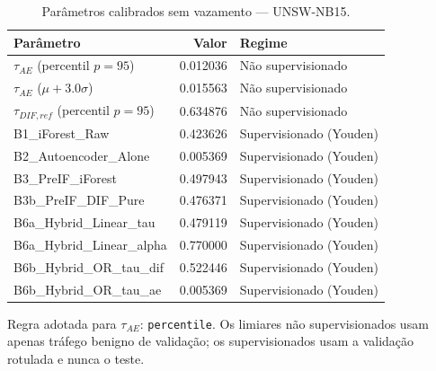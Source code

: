 \begin{table}[htbp]
\centering
\caption{Parâmetros calibrados sem vazamento — UNSW-NB15.}
\label{tab:calibracao-unsw-nb15}
\small
\begin{tabular}{lrl}
\hline
Parâmetro & Valor & Regime \\
\hline
$\tau_{AE}$ (percentil $p=95$) & 0.012036 & Não supervisionado \\
$\tau_{AE}$ ($\mu + 3.0\sigma$) & 0.015563 & Não supervisionado \\
$\tau_{DIF,ref}$ (percentil $p=95$) & 0.634876 & Não supervisionado \\
B1\_iForest\_Raw & 0.423626 & Supervisionado (Youden) \\
B2\_Autoencoder\_Alone & 0.005369 & Supervisionado (Youden) \\
B3\_PreIF\_iForest & 0.497943 & Supervisionado (Youden) \\
B3b\_PreIF\_DIF\_Pure & 0.476371 & Supervisionado (Youden) \\
B6a\_Hybrid\_Linear\_tau & 0.479119 & Supervisionado (Youden) \\
B6a\_Hybrid\_Linear\_alpha & 0.770000 & Supervisionado (Youden) \\
B6b\_Hybrid\_OR\_tau\_dif & 0.522446 & Supervisionado (Youden) \\
B6b\_Hybrid\_OR\_tau\_ae & 0.005369 & Supervisionado (Youden) \\
\hline
\end{tabular}
\begin{flushleft}\footnotesize Regra adotada para $\tau_{AE}$: \texttt{percentile}. Os limiares não supervisionados usam apenas tráfego benigno de validação; os supervisionados usam a validação rotulada e nunca o teste.\end{flushleft}
\end{table}
